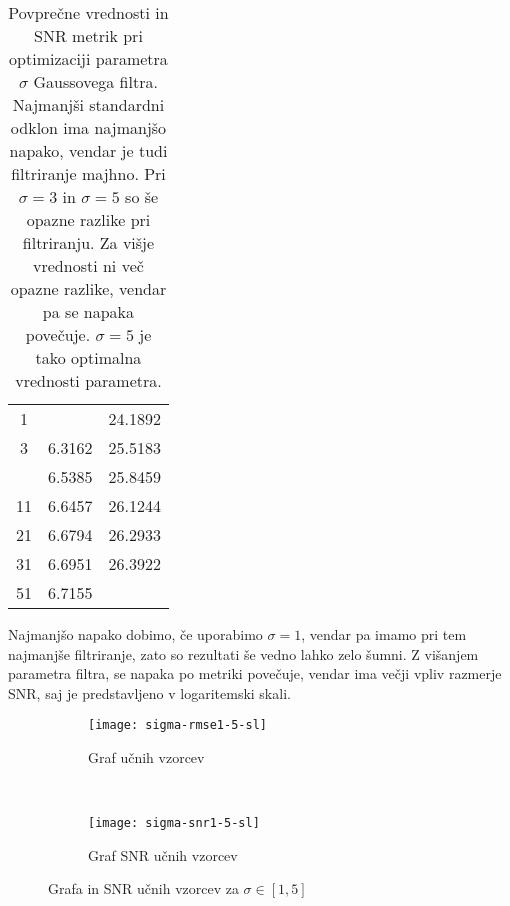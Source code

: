 \begin{table}[!htb]
	\centering
	\begin{tabular}{S[table-format=2.0, round-mode=places, round-precision=2] S[table-format=1.2, round-mode=places, round-precision=2] S[table-format=2.2, round-mode=places, round-precision=2]}
		\toprule
		\theadm{\sigma} & \thead{\rmse} &   \\
		 &  & 24.1892\\
		3 & 6.3162 & 25.5183\\
		 & 6.5385 & 25.8459\\
		11 & 6.6457 & 26.1244\\
		21 & 6.6794 & 26.2933\\
		31 & 6.6951 & 26.3922\\
		51 & 6.7155 & \\
		\bottomrule
	\end{tabular}
	\caption[Metrike pri optimizaciji Gaussovega filtra]{Povprečne vrednosti \rmse in SNR metrik pri optimizaciji parametra $\sigma$ Gaussovega filtra. Najmanjši standardni odklon ima najmanjšo napako, vendar je tudi filtriranje majhno. Pri $\sigma=3$ in $\sigma=5$ so še opazne razlike pri filtriranju. Za višje vrednosti ni več opazne razlike, vendar pa se napaka povečuje. $\sigma=5$ je tako optimalna vrednosti parametra.}
	\label{tab:gauss}
\end{table}

Najmanjšo napako dobimo, če uporabimo $\sigma=1$, vendar pa imamo pri tem najmanjše filtriranje, zato so rezultati še vedno lahko zelo šumni. Z višanjem parametra filtra, se napaka po metriki \rmse povečuje, vendar ima večji vpliv razmerje SNR, saj je predstavljeno v logaritemski skali. 

\begin{figure}[!htb]
	\centering
	\begin{subfigure}[t]{0.45\columnwidth}
		\texttt{[image: sigma-rmse1-5-sl]}
		\caption{Graf \rmse  učnih vzorcev }
		\label{fig:sigma-rmse1-5}
	\end{subfigure}
	~
	\begin{subfigure}[t]{0.45\columnwidth}
		\texttt{[image: sigma-snr1-5-sl]}
		\caption{Graf SNR  učnih vzorcev}
		\label{fig:sigma-snr1-5}
	\end{subfigure}
	\caption{Grafa \rmse in SNR učnih vzorcev za \mbox{$\sigma \in [1,5]$}}
	\label{fig:sigma1-5}
\end{figure}

